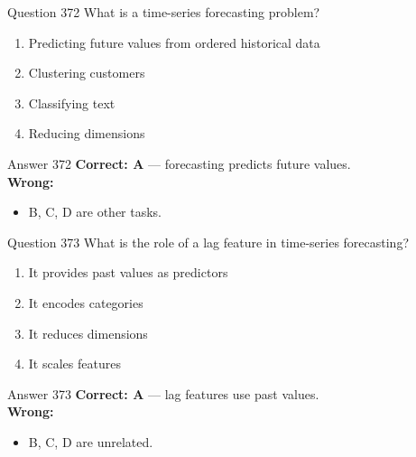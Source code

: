 \documentclass[aspectratio=169,11pt]{beamer}
\begin{document}
	\begin{frame}{Question 372}
		What is a time-series forecasting problem?
		\begin{enumerate}[label=\Alph*.]
			\item Predicting future values from ordered historical data
			\item Clustering customers
			\item Classifying text
			\item Reducing dimensions
		\end{enumerate}
	\end{frame}
	\begin{frame}{Answer 372}
		\textbf{Correct: A} --- forecasting predicts future values.\\
		\vspace{0.5em}
		\textbf{Wrong:}
		\begin{itemize}
			\item B, C, D are other tasks.
		\end{itemize}
	\end{frame}
	
	\begin{frame}{Question 373}
		What is the role of a lag feature in time-series forecasting?
		\begin{enumerate}[label=\Alph*.]
			\item It provides past values as predictors
			\item It encodes categories
			\item It reduces dimensions
			\item It scales features
		\end{enumerate}
	\end{frame}
	\begin{frame}{Answer 373}
		\textbf{Correct: A} --- lag features use past values.\\
		\vspace{0.5em}
		\textbf{Wrong:}
		\begin{itemize}
			\item B, C, D are unrelated.
		\end{itemize}
	\end{frame}
	
\end{document}
